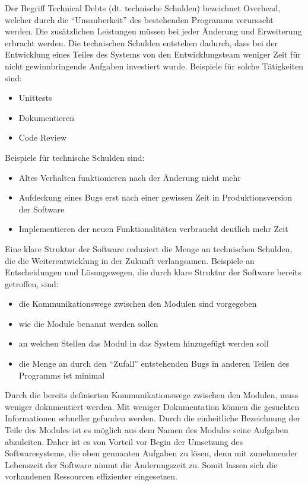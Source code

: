 Der Begriff Technical Debts (dt. technische Schulden) bezeichnet Overhead, 
welcher durch die ``Unsauberkeit'' des bestehenden Programms verursacht werden.
Die zusätzlichen Leistungen müssen bei jeder Änderung und Erweiterung erbracht werden.
Die technischen Schulden entstehen dadurch, dass bei der Entwicklung eines Teiles des Systems
von den Entwicklungsteam weniger Zeit für nicht gewinnbringende Aufgaben investiert wurde.
Beispiele für solche Tätigkeiten sind:
\begin{itemize}
    \item Unittests
    \item Dokumentieren 
    \item Code Review
\end{itemize}

Beispiele für technische Schulden sind:
\begin{itemize}
    \item Altes Verhalten funktionieren nach der Änderung nicht mehr
    \item Aufdeckung eines Bugs erst nach einer gewissen Zeit in Produktionsversion der Software
    \item Implementieren der neuen Funktionalitäten verbraucht deutlich mehr Zeit
\end{itemize}

Eine klare Struktur der Software reduziert die Menge an technischen Schulden, 
die die Weiterentwicklung in der Zukunft verlangsamen. 
Beispiele an Entscheidungen und Lösungswegen, 
die durch klare Struktur der Software bereits getroffen, sind:

\begin{itemize}
    \item die Kommunikationswege zwischen den Modulen sind vorgegeben
    \item wie die Module benannt werden sollen
    \item an welchen Stellen das Modul in das System hinzugefügt werden soll
    \item die Menge an durch den ``Zufall'' entstehenden Bugs in anderen Teilen des Programms ist minimal
\end{itemize}

Durch die bereits definierten Kommunikationswege zwischen den Modulen, muss weniger dokumentiert werden.
Mit weniger Dokumentation können die gesuchten Informationen schneller gefunden werden.
Durch die einheitliche Bezeichnung der Teile des Modules ist es möglich aus dem Namen des Modules seine Aufgaben abzuleiten.
Daher ist es von Vorteil vor Begin der Umsetzung des Softwaresystems, die oben gennanten Aufgaben zu lösen,
denn mit zunehmender Lebenszeit der Software nimmt die Änderungszeit zu.
Somit lassen sich die vorhandenen Ressourcen effizienter eingesetzen.